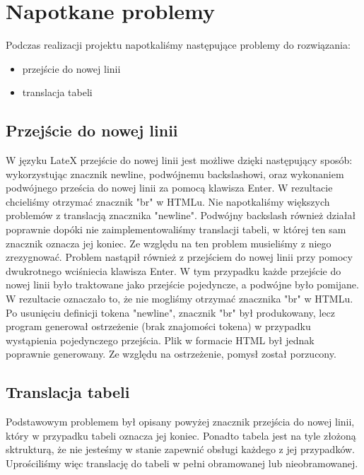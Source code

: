 \chapter{Napotkane problemy}


Podczas realizacji projektu napotkaliśmy następujące problemy do rozwiązania:
    \begin{itemize}
        \item przejście do nowej linii
        \item translacja tabeli
    \end{itemize}

\section{Przejście do nowej linii}

W języku LateX przejście do nowej linii jest możliwe dzięki następujący sposób: wykorzystując znacznik newline, podwójnemu backslashowi, 
oraz wykonaniem podwójnego prześcia do nowej linii za pomocą klawisza Enter. W rezultacie chcieliśmy otrzymać znacznik "br" w HTMLu. 
Nie napotkaliśmy większych problemów z translacją znacznika "newline". Podwójny backslash również działał poprawnie dopóki nie 
zaimplementowaliśmy translacji tabeli, w której ten sam znacznik oznacza jej koniec. Ze względu na ten problem musieliśmy z niego 
zrezygnować. Problem nastąpił również z przejściem do nowej linii przy pomocy dwukrotnego wciśniecia klawisza Enter. W tym przypadku 
każde przejście do nowej linii było traktowane jako przejście pojedyncze, a podwójne było pomijane. W rezultacie oznaczało to, że nie 
mogliśmy otrzymać znacznika "br" w HTMLu. Po usunięciu definicji tokena "newline", znacznik "br" był produkowany, lecz program 
generował ostrzeżenie (brak znajomości tokena) w przypadku wystąpienia pojedynczego przejścia. Plik w formacie HTML był jednak 
poprawnie generowany. Ze względu na ostrzeżenie, pomysł został porzucony.

\section{Translacja tabeli}

Podstawowym problemem był opisany powyżej znacznik przejścia do nowej linii, który w przypadku tabeli oznacza jej koniec. Ponadto 
tabela jest na tyle złożoną sktrukturą, że nie jesteśmy w stanie zapewnić obsługi każdego z jej przypadków. Uprościliśmy więc translację 
do tabeli w pełni obramowanej lub nieobramowanej.